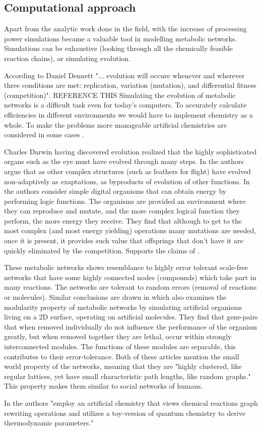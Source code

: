 \documentclass[10pt,a4paper]{article}
\begin{document}
	\subsection{Computational approach}
	
	Apart from the analytic work done in the field, with the increase of processing power simulations became a valuable tool in modelling metabolic networks. Simulations can be exhaustive (looking through all the chemically feasible reaction chains), or simulating evolution. 
	
	According to Daniel Dennett "... evolution will occure whenever and wherever three conditions are met: replication, variation (mutation), and differential fitness (competition)". REFERENCE THIS 
	Simulating the evolution of metabolic networks is a difficult task even for today's computers. To accurately calculate efficiencies in different environments we would have to implement chemistry as a whole. To make the problems more manageable artificial chemistries are considered in some cases \cite{artificialreview} \cite{artificialshort}.
	

	Charles Darwin having discovered evolution \cite{darwin} realized that the highly  sophisticated organs such as the eye must have evolved through many steps. In \cite{latent} the authors argue that as other complex structures (such as feathers for flight) have evolved non-adaptively as exaptations, as byproducts of evolution of other functions. In \cite{complexfeatures} the authors consider simple digital organisms that can obtain energy by performing logic functions. The organisms are provided an environment where they can reproduce and mutate, and the more complex logical function they perform, the more energy they receive. They find that although to get to the most complex (and most energy yielding) operations many mutations are needed, once it is present, it provides such value that offsprings that don't have it are quickly eliminated by the competition. Supports the claims of \cite{latent}.
	
	These metabolic networks shows resemblance to highly error tolerant scale-free networks \cite{largescale} that have some highly connected nodes (compounds) which take part in many reactions. The networks are tolerant to random errors (removal of reactions or molecules). Similar conclusions are drawn in \cite{complexfeatures} which also examines the modularity property of metabolic networks by simulating artificial organisms living on a 2D surface, operating on artificial molecules. They find that gene-pairs that when removed individually do not influence the performance of the organism greatly, but when removed together  they are lethal, occur within strongly interconnected modules. The functions of these modules are separable, this contributes to their error-tolerance. Both of these articles mention the small world \cite{smallworld} property of the networks, meaning that they are "highly clustered, like regular lattices, yet have small characteristic path lengths, like random graphs." This property makes them similar to social networks of humans. 
	
	In \cite{computationalframework} the authors "employ an artificial chemistry that views chemical reactions graph rewriting operations and utilizes a toy-version of quantum chemistry to derive thermodynamic parameters." 
	
	\fi
	
	
	
	
\end{document}
